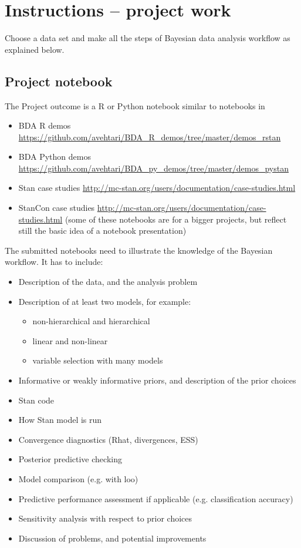 \documentclass[a4paper,11pt]{article}
\begin{document}
\thispagestyle{empty}

\section*{Instructions -- project work}
Choose a data set and make all the steps of Bayesian data
  analysis workflow as explained below. 
  
\subsection*{Project notebook}
  
  The Project outcome is a R or Python notebook similar to notebooks in
\begin{itemize}[noitemsep,topsep=0pt]
  \item BDA R demos \url{https://github.com/avehtari/BDA_R_demos/tree/master/demos_rstan}
  \item BDA Python demos \url{https://github.com/avehtari/BDA_py_demos/tree/master/demos_pystan}
  \item Stan case studies \url{http://mc-stan.org/users/documentation/case-studies.html}
  \item StanCon case studies \url{http://mc-stan.org/users/documentation/case-studies.html}
  (some of these notebooks are for a bigger projects, but reflect still the basic idea of a notebook presentation)
\end{itemize}

The submitted notebooks need to illustrate the knowledge of the
  Bayesian workflow. It has to include:
\begin{itemize}
  \item Description of the data, and the analysis problem
  \item Description of at least two models, for example:
    \begin{itemize}
    \item non-hierarchical and hierarchical
    \item linear and non-linear
    \item variable selection with many models
    \end{itemize}
  \item Informative or weakly informative priors, and description of the prior choices
  \item Stan code
  \item How Stan model is run
  \item Convergence diagnostics (Rhat, divergences, ESS)
  \item Posterior predictive checking
  \item Model comparison (e.g. with loo)
  \item Predictive performance assessment if applicable
    (e.g. classification accuracy)
  \item Sensitivity analysis with respect to prior choices
  \item Discussion of problems, and potential improvements 
\end{itemize}
\end{document}
